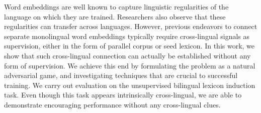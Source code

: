 Word embeddings are well known to capture linguistic regularities of the language on which they are trained. Researchers also observe that these regularities can transfer across languages. However, previous endeavors to connect separate monolingual word embeddings typically require cross-lingual signals as supervision, either in the form of parallel corpus or seed lexicon. In this work, we show that such cross-lingual connection can actually be established without any form of supervision. We achieve this end by formulating the problem as a natural adversarial game, and investigating techniques that are crucial to successful training. We carry out evaluation on the unsupervised bilingual lexicon induction task. Even though this task appears intrinsically cross-lingual, we are able to demonstrate encouraging performance without any cross-lingual clues.
